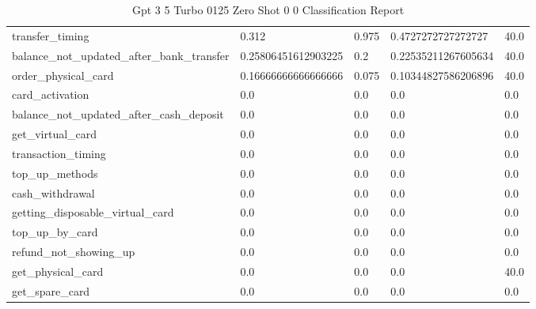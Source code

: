 \begin{table}[!ht]
\begin{tabularx}{\textwidth}{X l l l l}
transfer\_timing & \num{0.312} & \num{0.975} & \num{0.4727272727272727} & \num{40.0} \\
balance\_not\_updated\_after\_bank\_transfer & \num{0.25806451612903225} & \num{0.2} & \num{0.22535211267605634} & \num{40.0} \\
order\_physical\_card & \num{0.16666666666666666} & \num{0.075} & \num{0.10344827586206896} & \num{40.0} \\
card\_activation & \num{0.0} & \num{0.0} & \num{0.0} & \num{0.0} \\
balance\_not\_updated\_after\_cash\_deposit & \num{0.0} & \num{0.0} & \num{0.0} & \num{0.0} \\
get\_virtual\_card & \num{0.0} & \num{0.0} & \num{0.0} & \num{0.0} \\
transaction\_timing & \num{0.0} & \num{0.0} & \num{0.0} & \num{0.0} \\
top\_up\_methods & \num{0.0} & \num{0.0} & \num{0.0} & \num{0.0} \\
cash\_withdrawal & \num{0.0} & \num{0.0} & \num{0.0} & \num{0.0} \\
getting\_disposable\_virtual\_card & \num{0.0} & \num{0.0} & \num{0.0} & \num{0.0} \\
top\_up\_by\_card & \num{0.0} & \num{0.0} & \num{0.0} & \num{0.0} \\
refund\_not\_showing\_up & \num{0.0} & \num{0.0} & \num{0.0} & \num{0.0} \\
get\_physical\_card & \num{0.0} & \num{0.0} & \num{0.0} & \num{40.0} \\
get\_spare\_card & \num{0.0} & \num{0.0} & \num{0.0} & \num{0.0} \\
\bottomrule
\end{tabularx}

        \caption{Gpt 3 5 Turbo 0125 Zero Shot 0 0 Classification Report}
        \label{tab:gpt-3-5-turbo-0125-zero-shot-0-0-classification-report}
    \end{table}
    